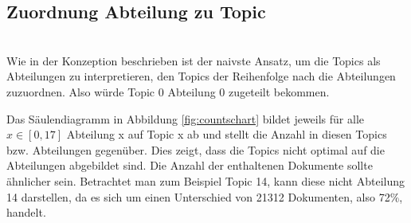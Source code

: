 \documentclass[german,version-2020-11]{uzl-thesis}
\begin{document}
\subsection{Zuordnung Abteilung zu Topic}\\
Wie in der Konzeption beschrieben ist der naivste Ansatz, um die Topics als Abteilungen zu interpretieren, den Topics der Reihenfolge nach die Abteilungen zuzuordnen. Also würde Topic 0 Abteilung 0 zugeteilt bekommen. \\
\begin{center}
\end{center}

Das Säulendiagramm in Abbildung \ref{fig:countschart} bildet jeweils für alle $x \in [0,17]$ Abteilung x auf Topic x ab und stellt die Anzahl in diesen Topics bzw. Abteilungen gegenüber. Dies zeigt, dass die Topics nicht optimal auf die Abteilungen abgebildet sind. Die Anzahl der enthaltenen Dokumente sollte ähnlicher sein. Betrachtet man zum Beispiel Topic 14, kann diese nicht Abteilung 14 darstellen, da es sich um einen Unterschied von 21312 Dokumenten, also 72$\%$, handelt.\\
\end{document}
